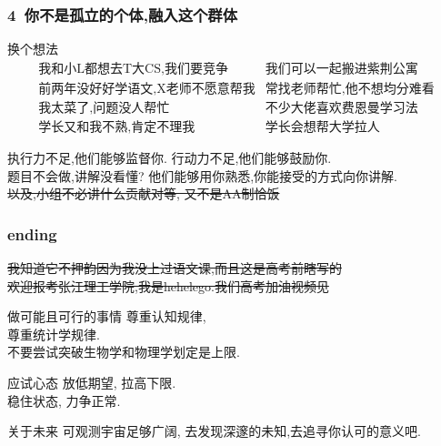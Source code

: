 \documentclass[10pt]{beamer}
\begin{document}
\begin{frame}
	\frametitle{4\ 你不是孤立的个体,融入这个群体}

	\begin{block}{换个想法}
		\[
			\begin{array}{ll}
			\text{我和小L都想去T大CS,我们要竞争}& \text{我们可以一起搬进紫荆公寓}\\
			\text{前两年没好好学语文,X老师不愿意帮我} & \text{常找老师帮忙,他不想均分难看}\\
			\text{我太菜了,问题没人帮忙} & \text{不少大佬喜欢费恩曼学习法}\\
			\text{学长又和我不熟,肯定不理我} &\text{学长会想帮大学拉人}
		\end{array}
		\]
	\end{block}
	\vspace{1em} \pause{}

	执行力不足,他们能够监督你. 行动力不足,他们能够鼓励你.\\
	题目不会做,讲解没看懂? 他们能够用你熟悉,你能接受的方式向你讲解.\\
	\vspace{1em}
	\sout{以及,小组不必讲什么贡献对等, 又不是AA制恰饭}
\end{frame}

\begin{frame}
	\frametitle{ending}

	\sout{我知道它不押韵因为我没上过语文课,而且这是高考前瞎写的}\\
	\sout{欢迎报考张江理工学院,我是hehelego.我们高考加油视频见}\\

	\begin{block}{做可能且可行的事情}
		尊重认知规律,\\
		尊重统计学规律.\\
		不要尝试突破生物学和物理学划定是上限.
	\end{block}

	\begin{block}{应试心态}
		放低期望, 拉高下限.\\
		稳住状态, 力争正常.
	\end{block}

	\begin{block}{关于未来}
		可观测宇宙足够广阔, 去发现深邃的未知,去追寻你认可的意义吧.
	\end{block}
\end{frame}
\end{document}
